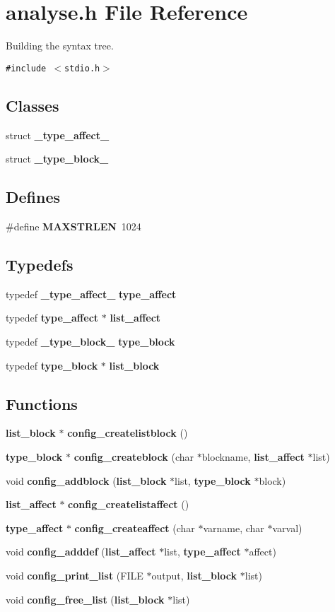 \section{analyse.h File Reference}
\label{analyse_8h}
Building the syntax tree. 

{\tt \#include $<$stdio.h$>$}\par
\subsection*{Classes}
\begin{CompactItemize}
\item 
struct {\bf \_\-type\_\-affect\_\-}
\item 
struct {\bf \_\-type\_\-block\_\-}
\end{CompactItemize}
\subsection*{Defines}
\begin{CompactItemize}
\item 
\#define {\bf MAXSTRLEN}\ 1024
\end{CompactItemize}
\subsection*{Typedefs}
\begin{CompactItemize}
\item 
typedef {\bf \_\-type\_\-affect\_\-} {\bf type\_\-affect}
\item 
typedef {\bf type\_\-affect} $\ast$ {\bf list\_\-affect}
\item 
typedef {\bf \_\-type\_\-block\_\-} {\bf type\_\-block}
\item 
typedef {\bf type\_\-block} $\ast$ {\bf list\_\-block}
\end{CompactItemize}
\subsection*{Functions}
\begin{CompactItemize}
\item 
{\bf list\_\-block} $\ast$ {\bf config\_\-createlistblock} ()
\item 
{\bf type\_\-block} $\ast$ {\bf config\_\-createblock} (char $\ast$blockname, {\bf list\_\-affect} $\ast$list)
\item 
void {\bf config\_\-addblock} ({\bf list\_\-block} $\ast$list, {\bf type\_\-block} $\ast$block)
\item 
{\bf list\_\-affect} $\ast$ {\bf config\_\-createlistaffect} ()
\item 
{\bf type\_\-affect} $\ast$ {\bf config\_\-createaffect} (char $\ast$varname, char $\ast$varval)
\item 
void {\bf config\_\-adddef} ({\bf list\_\-affect} $\ast$list, {\bf type\_\-affect} $\ast$affect)
\item 
void {\bf config\_\-print\_\-list} (FILE $\ast$output, {\bf list\_\-block} $\ast$list)
\item 
void {\bf config\_\-free\_\-list} ({\bf list\_\-block} $\ast$list)
\end{CompactItemize}


